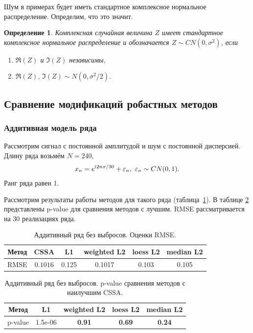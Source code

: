\documentclass[specialist,
               substylefile = spbu.rtx,
               subf,href,colorlinks=true, 12pt]{disser}
\newtheorem*{def*}{Определение}
\begin{document}
Шум в примерах будет иметь стандартное комплексное нормальное распределение. Определим, что это значит.
\begin{def*}
	Комплексная случайная величина $Z$ имеет стандартное комплексное нормальное распределение и обозначается $Z \sim CN(0, \sigma^2)$, если
	\begin{enumerate}
		\item $\Re(Z)$ и $\Im(Z)$ независимы,
		\item $\Re(Z), \, \Im(Z) \sim N(0, \sigma^2/2)$.
	\end{enumerate}
\end{def*}

\subsection{Сравнение модификаций робастных методов}

\subsubsection{Аддитивная модель ряда}

Рассмотрим сигнал с постоянной амплитудой и шум с постоянной дисперсией.
Длину ряда возьмём $N = 240$,
$$x_n = e^{\mathrm{i}\mkern1mu 2n\pi/30} + \varepsilon_n, ~ \varepsilon_n \sim CN(0,1).$$
Ранг ряда равен 1.

Рассмотрим результаты работы методов для такого ряда (таблица~\ref{tab1}). В таблице \ref{tab: pval1} представлены p-value для сравнения методов с лучшим. RMSE рассматривается на 30 реализациях ряда.

\begin{table}[H]
	\begin{center}
		\caption{Аддитивный ряд без выбросов. Оценки RMSE.}
		\label{tab1}
		\begin{tabular}{|c|c|c|c|c|c|}
			\hline
			Метод	& CSSA & L1 & weighted L2 & loess L2 & median L2 \\
			\hline
			RMSE & $\mathbf{0.1016}$  & 0.125  & 0.1017 & 0.103 & 0.105\\
			\hline
		\end{tabular}
	\end{center}
\end{table}

\begin{table}[H]
	\caption{Аддитивный ряд без выбросов. p-value сравнения методов с наилучшим CSSA.}
	\label{tab: pval1}
	\begin{center}
		\begin{tabular}{|c|c|c|c|c|}
			\hline
			Метод & L1 & weighted L2 & loess L2 & median L2  \\
			\hline
			p-value & 1.5e-06   & \textbf{0.91} & \textbf{0.69}  & \textbf{0.24}\\
			\hline
		\end{tabular}
	\end{center}
\end{table}
\end{document}
